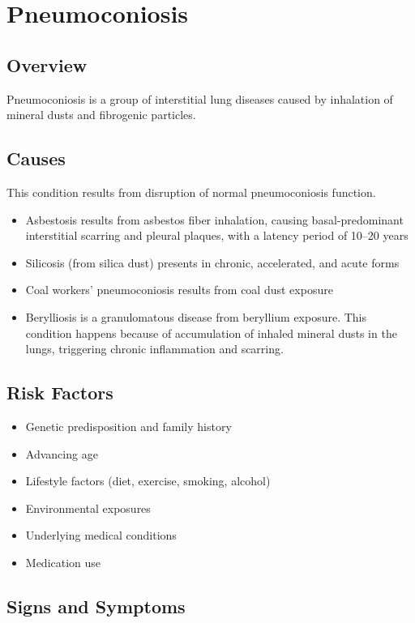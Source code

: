 \chapter{Pneumoconiosis}
\label{sec:Pneumoconiosis}

\section{Overview}
Pneumoconiosis is a group of interstitial lung diseases caused by inhalation of mineral dusts and fibrogenic particles.
\section{Causes}
This condition results from disruption of normal pneumoconiosis function.

\begin{itemize}[noitemsep]
  \item Asbestosis results from asbestos fiber inhalation, causing basal-predominant interstitial scarring and pleural plaques, with a latency period of 10--20 years
  \item Silicosis (from silica dust) presents in chronic, accelerated, and acute forms
  \item Coal workers' pneumoconiosis results from coal dust exposure
  \item Berylliosis is a granulomatous disease from beryllium exposure. This condition happens because of accumulation of inhaled mineral dusts in the lungs, triggering chronic inflammation and scarring.
\end{itemize}
\section{Risk Factors}


\begin{itemize}[noitemsep]
  \item Genetic predisposition and family history
  \item Advancing age
  \item Lifestyle factors (diet, exercise, smoking, alcohol)
  \item Environmental exposures
  \item Underlying medical conditions
  \item Medication use
\end{itemize}
\section{Signs and Symptoms}


